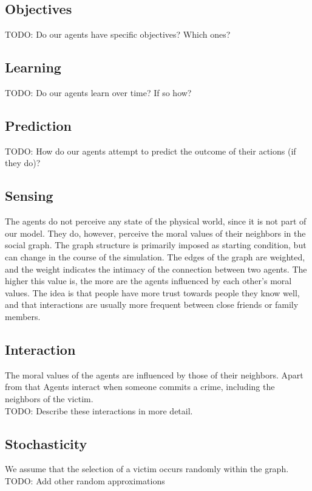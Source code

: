 \documentclass{article}
\begin{document}
		\subsection{Objectives}
			TODO: Do our agents have specific objectives? Which ones?

		\subsection{Learning}
			TODO: Do our agents learn over time? If so how?

		\subsection{Prediction}
			TODO: How do our agents attempt to predict the outcome of their actions (if they do)?

		\subsection{Sensing}
			The agents do not perceive any state of the physical world, since it is not part of our
			model. They do, however, perceive the moral values of their neighbors in the social
			graph. The graph structure is primarily imposed as starting condition, but can change
			in the course of the simulation. The edges of the graph are weighted, and the weight
			indicates the intimacy of the connection between two agents. The higher this value is,
			the more are the agents influenced by each other's moral values. The idea is that
			people have more trust towards people they know well, and that interactions are usually
			more frequent between close friends or family members.

		\subsection{Interaction}
			The moral values of the agents are influenced by those of their neighbors. Apart from
			that Agents interact when someone commits a crime, including the neighbors of the victim.\\
			TODO: Describe these interactions in more detail.

		\subsection{Stochasticity}
			We assume that the selection of a victim occurs randomly within the graph.\\
			TODO: Add other random approximations
\end{document}
